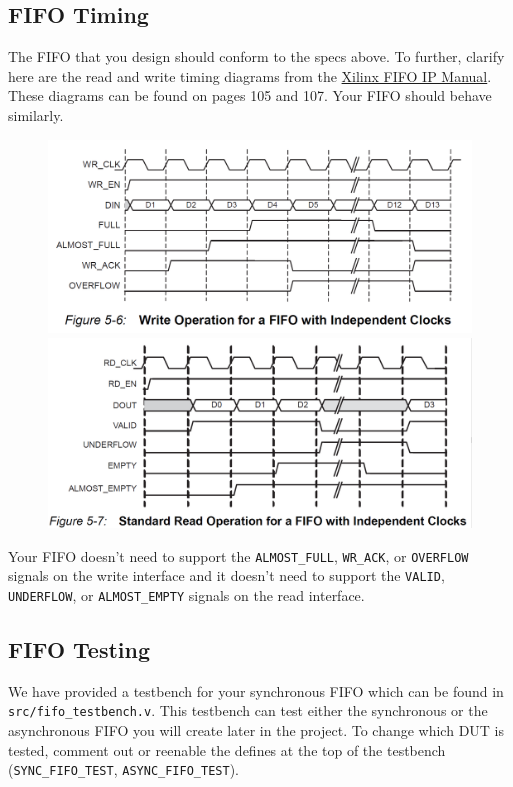 \documentclass[11pt]{article}
\begin{document}
\subsection{FIFO Timing}
The FIFO that you design should conform to the specs above. To further, clarify here are the read and write timing diagrams from the \href{https://www.xilinx.com/support/documentation/ip_documentation/fifo_generator_ug175.pdf}{Xilinx FIFO IP Manual}. These diagrams can be found on pages 105 and 107. Your FIFO should behave similarly.

\begin{figure}[H]
	\includegraphics[width=\linewidth]{sync_fifo_write_operation.png}
	\endminipage\hfill
	\includegraphics[width=\linewidth]{sync_fifo_read_operation.png}
	\endminipage
\end{figure}

Your FIFO doesn't need to support the \verb|ALMOST_FULL|, \verb|WR_ACK|, or \verb|OVERFLOW| signals on the write interface and it doesn't need to support the \verb|VALID|, \verb|UNDERFLOW|, or \verb|ALMOST_EMPTY| signals on the read interface.

\subsection{FIFO Testing}
We have provided a testbench for your synchronous FIFO which can be found in \verb|src/fifo_testbench.v|. This testbench can test either the synchronous or the asynchronous FIFO you will create later in the project. To change which DUT is tested, comment out or reenable the defines at the top of the testbench (\verb|SYNC_FIFO_TEST|, \verb|ASYNC_FIFO_TEST|).
\end{document}
